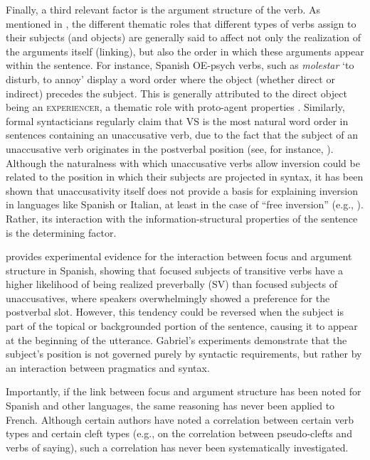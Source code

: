Finally, a third relevant factor is the argument structure of the verb. As mentioned in , the different thematic roles that different types of verbs assign to their subjects (and objects) are generally said to affect not only the realization of the arguments itself (linking), but also the order in which these arguments appear within the sentence. For instance, Spanish OE-psych verbs, such as \textit{molestar} `to disturb, to annoy' display a word order where the object (whether direct or indirect) precedes the subject. This is generally attributed to the direct object being an \textsc{experiencer}, a thematic role with proto-agent properties \parencite{dowty1991thematic}. Similarly, formal syntacticians regularly claim that VS is the most natural  word  order in sentences containing an unaccusative verb, due to the fact that the subject of an unaccusative verb originates in the postverbal  position (see, for instance, \cite{burzio1986italian, rizzi1982issues, belletti1988case}). Although the naturalness with which unaccusative verbs allow inversion could be related to the position in which their subjects are projected in syntax, it has been shown that unaccusativity itself does not provide a basis for explaining  inversion in languages like Spanish or Italian, at least in the case of ``free inversion'' (e.g., \cite{leonetti2018two}). Rather, its interaction with the information-structural properties of the sentence is the determining factor. 

\textcite{gabriel2007fokus} provides experimental evidence for the interaction between focus and argument structure in Spanish, showing that focused subjects of transitive verbs have a higher likelihood of being realized preverbally (SV) than focused subjects of unaccusatives, where speakers overwhelmingly showed a preference for the postverbal slot. However, this tendency could be reversed when the subject is part of the topical or backgrounded portion of the sentence, causing it to appear at the beginning of the utterance. Gabriel's experiments demonstrate that the subject's position is not governed purely by syntactic requirements, but rather by an interaction between pragmatics and syntax. 

Importantly, if the link between focus and argument structure has been noted for Spanish and other languages, the same reasoning has never been applied to French. Although certain authors have noted a correlation between certain verb types and certain cleft types (e.g., \cite{apotheloz2012pseudo} on the correlation between pseudo-clefts and verbs of saying), such a correlation has never been systematically investigated.

